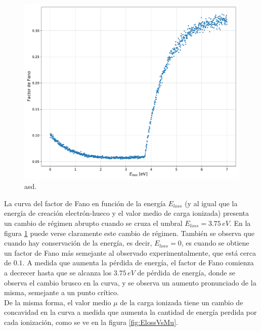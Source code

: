 \begin{figure}%
    \centering
    \includegraphics[scale=0.35]{Figs/Fano_vs_Eloss_5ktrials_0-7Eloss.pdf}
    \caption{\footnotesize{asd.}}
    \label{fig:FanoVsEloss}
\end{figure}
La curva del factor de Fano en función de la energía $E_{loss}$ (y al igual que la energía de creación electrón-hueco y el valor medio de carga ionizada) presenta un cambio de régimen abrupto cuando se cruza el umbral $E_{loss} = 3.75\,\si{eV}$. En la figura \ref{fig:FanoVsEloss} puede verse claramente este cambio de régimen. También se observa que cuando hay conservación de la energía, es decir, $E_{loss} = 0$, es cuando se obtiene un factor de Fano más semejante al observado experimentalmente, que está cerca de $0.1$. A medida que aumenta la pérdida de energía, el factor de Fano comienza a decrecer hasta que se alcanza los $3.75\,\si{eV}$ de pérdida de energía, donde se observa el cambio brusco en la curva, y se observa un aumento pronunciado de la misma, semejante a un punto crítico.\\
\indent De la misma forma, el valor medio $\mu$ de la carga ionizada tiene un cambio de concavidad en la curva a medida que aumenta la cantidad de energía perdida por cada ionización, como se ve en la figura \ref{fig:ElossVsMu}.
